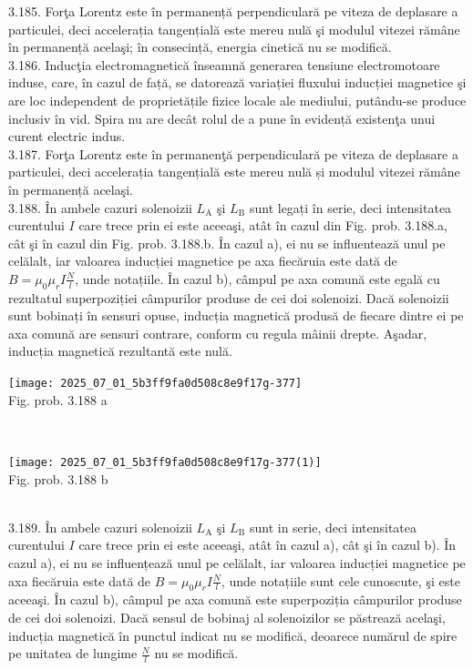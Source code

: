 \begin{center}
3.185. Forţa Lorentz este în permanență perpendiculară pe viteza de deplasare a particulei, deci accelerația tangențială este mereu nulă şi modulul vitezei rămâne în permanență acelaşi; în consecință, energia cinetică nu se modifică.\\

3.186. Inducţia electromagnetică înseamnă generarea tensiune electromotoare induse, care, în cazul de față, se datorează variației fluxului inducției magnetice şi are loc independent de proprietățile fizice locale ale mediului, putându-se produce inclusiv în vid. Spira nu are decât rolul de a pune în evidență existenţa unui curent electric indus.\\

3.187. Forţa Lorentz este în permanenţă perpendiculară pe viteza de deplasare a particulei, deci accelerația tangențială este mereu nulă și modulul vitezei rămâne în permanență acelaşi.\\

3.188. În ambele cazuri solenoizii $L_{\mathrm{A}}$ şi $L_{\mathrm{B}}$ sunt legați în serie, deci intensitatea curentului $I$ care trece prin ei este aceeaşi, atât în cazul din Fig. prob. 3.188.a, cât şi în cazul din Fig. prob. 3.188.b. În cazul a), ei nu se influentează unul pe celălalt, iar valoarea inducției magnetice pe axa fiecăruia este dată de $B=\mu_{0} \mu_{r} I \frac{N}{l}$, unde notațiile. În cazul b), câmpul pe axa comună este egală cu rezultatul superpoziției câmpurilor produse de cei doi solenoizi. Dacă solenoizii sunt bobinați în sensuri opuse, inducția magnetică produsă de fiecare dintre ei pe axa comună are sensuri contrare, conform cu regula mâinii drepte. Aşadar, inducția magnetică rezultantă este nulă.\\ \begin{center} \texttt{[image: 2025\_07\_01\_5b3ff9fa0d508c8e9f17g-377]}\\ Fig. prob. 3.188 a \end{center}\\ \begin{center} \texttt{[image: 2025\_07\_01\_5b3ff9fa0d508c8e9f17g-377(1)]}\\ Fig. prob. 3.188 b \end{center}\\

3.189. În ambele cazuri solenoizii $L_{\mathrm{A}}$ şi $L_{\mathrm{B}}$ sunt in serie, deci intensitatea curentului $I$ care trece prin ei este aceeaşi, atât în cazul a), cât şi în cazul b). În cazul a), ei nu se influențează unul pe celălalt, iar valoarea inducției magnetice pe axa fiecăruia este dată de $B=\mu_{0} \mu_{r} I \frac{N}{l}$, unde notațiile sunt cele cunoscute, şi este aceeaşi. În cazul b), câmpul pe axa comună este superpoziția câmpurilor produse de cei doi solenoizi. Dacă sensul de bobinaj al solenoizilor se păstrează acelaşi, inducția magnetică în punctul indicat nu se modifică, deoarece numărul de spire pe unitatea de lungime $\frac{N}{l}$ nu se modifică.\\


\end{center}
